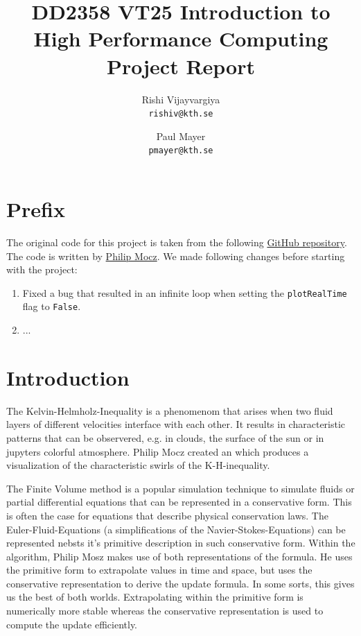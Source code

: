 \documentclass[a4paper,12pt]{article}
\title{
  \normalsize{DD2358 VT25 Introduction to}\\
  \normalsize{High Performance Computing}\\
  \large{Project Report}
}
\author{
  \small Rishi Vijayvargiya\\[-0.75ex]
  \scriptsize\texttt{rishiv@kth.se}
  \and
  \small Paul Mayer\\[-0.75ex]
  \scriptsize\texttt{pmayer@kth.se}
}
\date{}
\begin{document}
\maketitle
\thispagestyle{firstpagestyle}

\listoftodos

\vspace{1em}

%

\section*{Prefix}
The original code for this project is taken from the following \href{https://github.com/pmocz/finitevolume-python/blob/master/finitevolume.py}{GitHub repository}.\\
The code is written by \href{https://pmocz.github.io}{Philip Mocz}.
We made following changes before starting with the project:

\begin{enumerate}
  \item Fixed a bug that resulted in an infinite loop when setting the \verb|plotRealTime| flag to \verb|False|.
  \item ...
\end{enumerate}

\tableofcontents
\newpage
\section{Introduction}
The Kelvin-Helmholz-Inequality is a phenomenom that arises when two fluid layers of different velocities interface with each other.
It results in characteristic patterns that can be observered, e.g. in clouds, the surface of the sun or in jupyters colorful atmosphere.
Philip Mocz created an which produces a visualization of the characteristic swirls of the K-H-inequality.

The Finite Volume method is a popular simulation technique to simulate fluids or partial differential equations that can be represented in a conservative form.
This is often the case for equations that describe physical conservation laws.
The Euler-Fluid-Equations (a simplifications of the Navier-Stokes-Equations) can be represented nebsts it's primitive description in such conservative form.
Within the algorithm, Philip Mosz makes use of both representations of the formula.
He uses the primitive form to extrapolate values in time and space, but uses the conservative representation to derive the update formula.
In some sorts, this gives us the best of both worlds.
Extrapolating within the primitive form is numerically more stable whereas the conservative representation is used to compute the update efficiently.
\end{document}

